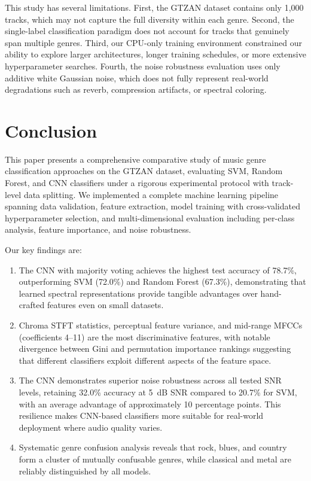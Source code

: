 \documentclass[10pt,journal]{IEEEtran}
\begin{document}
This study has several limitations. First, the GTZAN dataset contains only 1,000 tracks, which may not capture the full diversity within each genre. Second, the single-label classification paradigm does not account for tracks that genuinely span multiple genres. Third, our CPU-only training environment constrained our ability to explore larger architectures, longer training schedules, or more extensive hyperparameter searches. Fourth, the noise robustness evaluation uses only additive white Gaussian noise, which does not fully represent real-world degradations such as reverb, compression artifacts, or spectral coloring.

\section{Conclusion}

This paper presents a comprehensive comparative study of music genre classification approaches on the GTZAN dataset, evaluating SVM, Random Forest, and CNN classifiers under a rigorous experimental protocol with track-level data splitting. We implemented a complete machine learning pipeline spanning data validation, feature extraction, model training with cross-validated hyperparameter selection, and multi-dimensional evaluation including per-class analysis, feature importance, and noise robustness.

Our key findings are:
\begin{enumerate}
    \item The CNN with majority voting achieves the highest test accuracy of 78.7\%, outperforming SVM (72.0\%) and Random Forest (67.3\%), demonstrating that learned spectral representations provide tangible advantages over hand-crafted features even on small datasets.
    \item Chroma STFT statistics, perceptual feature variance, and mid-range MFCCs (coefficients 4--11) are the most discriminative features, with notable divergence between Gini and permutation importance rankings suggesting that different classifiers exploit different aspects of the feature space.
    \item The CNN demonstrates superior noise robustness across all tested SNR levels, retaining 32.0\% accuracy at 5~dB SNR compared to 20.7\% for SVM, with an average advantage of approximately 10 percentage points. This resilience makes CNN-based classifiers more suitable for real-world deployment where audio quality varies.
    \item Systematic genre confusion analysis reveals that rock, blues, and country form a cluster of mutually confusable genres, while classical and metal are reliably distinguished by all models.
\end{enumerate}
\end{document}
